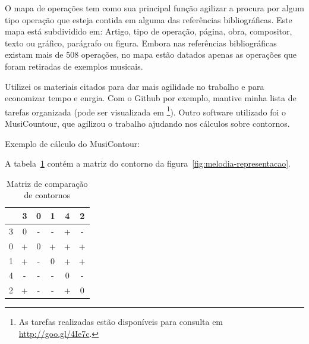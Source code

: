 \documentclass[11pt]{article}
\begin{document}
\label{sec:discussao}


O mapa de operações tem como sua principal função agilizar a procura por
algum tipo operação que esteja contida em alguma das referências bibliográficas.
Este mapa está subdividido em: Artigo, tipo de operação, página, obra, compositor, 
texto ou gráfico, parágrafo ou figura. Embora nas referências bibliográficas existam
mais de 508 operações, no mapa estão datados apenas as operações que foram retiradas
de exemplos musicais.

Utilizei os materiais citados para dar mais agilidade no trabalho e para
economizar tempo e enrgia. Com o Github por exemplo, mantive minha lista
de tarefas organizada (pode ser visualizada em \footnote{As
  tarefas realizadas estão disponíveis para consulta em
  \url{http://goo.gl/4Ie7c}.}). Outro software utilizado foi o MusiCountour, 
  que agilizou o trabalho ajudando nos cálculos sobre contornos.

Exemplo de cálculo do MusiContour:

A tabela~\ref{tab:matriz-comparacao-contornos} contém a matriz do
contorno da figura~\ref{fig:melodia-representacao}.

\begin{table}
  \centering
  \begin{tabular}{c|ccccc}
    &3&0&1&4&2\\
    \hline
    3&0&-&-&+&-\\
    0&+&0&+&+&+\\
    1&+&-&0&+&+\\
    4&-&-&-&0&-\\
    2&+&-&-&+&0\\
  \end{tabular}
  \caption{Matriz de comparação de contornos}
  \label{tab:matriz-comparacao-contornos}
\end{table}
\end{document}
